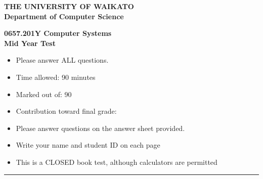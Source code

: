 \documentclass[a4paper,10pt]{article}
\begin{document}
{\centering \large \bf THE UNIVERSITY OF WAIKATO\\}
{\centering \large \bf Department of Computer Science\\[0.5cm]}

{\centering \large \bf 0657.201Y Computer Systems~\CORYEAR \\}
{\centering \large \bf Mid Year Test~\MIDTESTDATE \\[1cm]}

\begin{itemize}
  \item Please answer ALL questions.

  \item Time allowed: 90 minutes

  \item Marked out of: 90

  \item Contribution toward final grade: \MIDTESTWORTH
  
  \item Please answer questions on the answer sheet provided. 

  \item Write your name and student ID on each page

  \item This is a CLOSED book test, although calculators are permitted
\end{itemize}

\hrule
\end{document}
